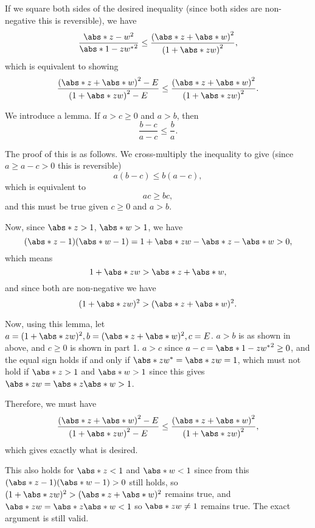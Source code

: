 If we square both sides of the desired inequality (since both sides are non-negative this is reversible), we have
\[
    \frac{\abs*{z - w}^2}{\abs*{1 - zw^*}^2} \leq \frac{\left(\abs*{z} + \abs*{w}\right)^2}{\left(1 + \abs*{zw}\right)^2},
\]
which is equivalent to showing
\[
    \frac{\left(\abs*{z} + \abs*{w}\right)^2 - E}{\left(1 + \abs*{zw}\right)^2 - E} \leq \frac{\left(\abs*{z} + \abs*{w}\right)^2}{\left(1 + \abs*{zw}\right)^2}.
\]

We introduce a lemma. If \(a > c \geq 0\) and \(a > b\), then
\[
    \frac{b - c}{a - c} \leq \frac{b}{a}.
\]

The proof of this is as follows. We cross-multiply the inequality to give (since \(a \geq a - c > 0\) this is reversible)
\[
    a(b - c) \leq  b (a - c),
\]
which is equivalent to
\[
    ac \geq bc,
\]
and this must be true given \(c \geq 0\) and \(a > b\).

Now, since \(\abs*{z} > 1\), \(\abs*{w} > 1\), we have
\[
    (\abs*{z} - 1)(\abs*{w} - 1) = 1 + \abs*{zw} - \abs*{z} - \abs*{w} > 0,
\]
which means
\[
    1 + \abs*{zw} > \abs*{z} + \abs*{w},
\]
and since both are non-negative we have
\[
    (1 + \abs*{zw})^2 > (\abs*{z} + \abs*{w})^2.
\]

Now, using this lemma, let \(a = (1 + \abs*{zw})^2, b = (\abs*{z} + \abs*{w})^2, c = E\). \(a > b\) is as shown in above, and \(c \geq 0\) is shown in part 1. \(a > c\) since \(a - c = \abs*{1 - zw^*}^2 \geq 0\), and the equal sign holds if and only if \(\abs*{zw^*} = \abs*{zw} = 1\), which must not hold if \(\abs*{z} > 1\) and \(\abs*{w} > 1\) since this gives \(\abs*{zw} = \abs*{z} \abs*{w} > 1\).

Therefore, we must have
\[
    \frac{\left(\abs*{z} + \abs*{w}\right)^2 - E}{\left(1 + \abs*{zw}\right)^2 - E} \leq \frac{\left(\abs*{z} + \abs*{w}\right)^2}{\left(1 + \abs*{zw}\right)^2},
\]
which gives exactly what is desired.

This also holds for \(\abs*{z} < 1\) and \(\abs*{w} < 1\) since from this \((\abs*{z} - 1)(\abs*{w} - 1) > 0\) still holds, so \((1 + \abs*{zw})^2 > (\abs*{z} + \abs*{w})^2\) remains true, and \(\abs*{zw} = \abs*{z}\abs*{w} < 1\) so \(\abs*{zw} \neq 1\) remains true. The exact argument is still valid.